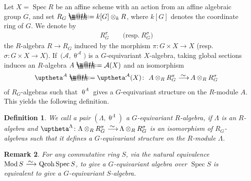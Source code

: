 \documentclass[10pt,a4paper]{amsart}
\makeatletter
\newtheorem{dfn}{Definition}[section]
\newtheorem{rem}[dfn]{Remark}
\newcommand*{\defeq}{\mathrel{\rlap{%
 \raisebox{0.3ex}{$\m@th\cdot$}}%
 \raisebox{-0.3ex}{$\m@th\cdot$}}%
 =}
\numberwithin{equation}{section}
\newcommand{\Spec}{\operatorname{Spec}}
\newcommand{\Qcoh}{\operatorname{Qcoh}}
\newcommand{\Mod}{\operatorname{Mod}}
\newcommand{\cA}{\mathcal{A}}
\newcommand{\simto}{\,\,\,\,\raisebox{4pt}{$\sim$}{\kern -1.1em \longrightarrow}\,}
\makeatother
\begin{document}
Let $X=\Spec R$ be an affine scheme with an action from an affine algebraic group $G$, and set $R_G\defeq k[G]\otimes_kR$, where $k[G]$ denotes the coordinate ring of $G$. We denote by
\begin{gather*}
R_G^{\pi}\qquad \big(\text{resp.}~R_G^{\sigma}\big)
\end{gather*}
the $R$-algebra $R\to R_G$ induced by the morphism $\pi\colon G\times X\to X$ (resp.\ $\sigma\colon G\times X\to X$).
If~$\big(\cA,\uptheta^{\cA}\big)$ is a $G$-equivariant $X$-algebra, taking global sections induces an $R$-algebra $A\defeq\cA(X)$ and an isomorphism
\begin{gather*}
\uptheta^{A}\defeq\uptheta^{\cA}(X)\colon\ A\otimes_R R_G^{\pi}\simto A\otimes_RR_G^{\sigma}
\end{gather*}
of $R_G$-algebras such that $\uptheta^{A}$ gives a $G$-equivariant structure on the $R$-module $A$. This yields the following definition.


 \begin{dfn}
 We call a pair
 $(\Lambda,\uptheta^{\Lambda})$
 a {\it $G$-equivariant $R$-algebra}, if $\Lambda$ is an $R$-algebra and $\uptheta^{\Lambda}\colon \Lambda\otimes_RR_G^{\pi}\simto\Lambda\otimes_RR_G^{\sigma}$ is an isomorphism of $R_G$-algebras such that it defines a $G$-equivariant structure on the $R$-module $\Lambda$.
 \end{dfn}

 \begin{rem}
For any commutative ring $S$, via the natural equivalence $\Mod S\simto \Qcoh \Spec S$, to give a $G$-equivariant algebra over $\Spec S$ is equivalent to give a $G$-equivariant $S$-algebra.
 \end{rem}
\end{document}
